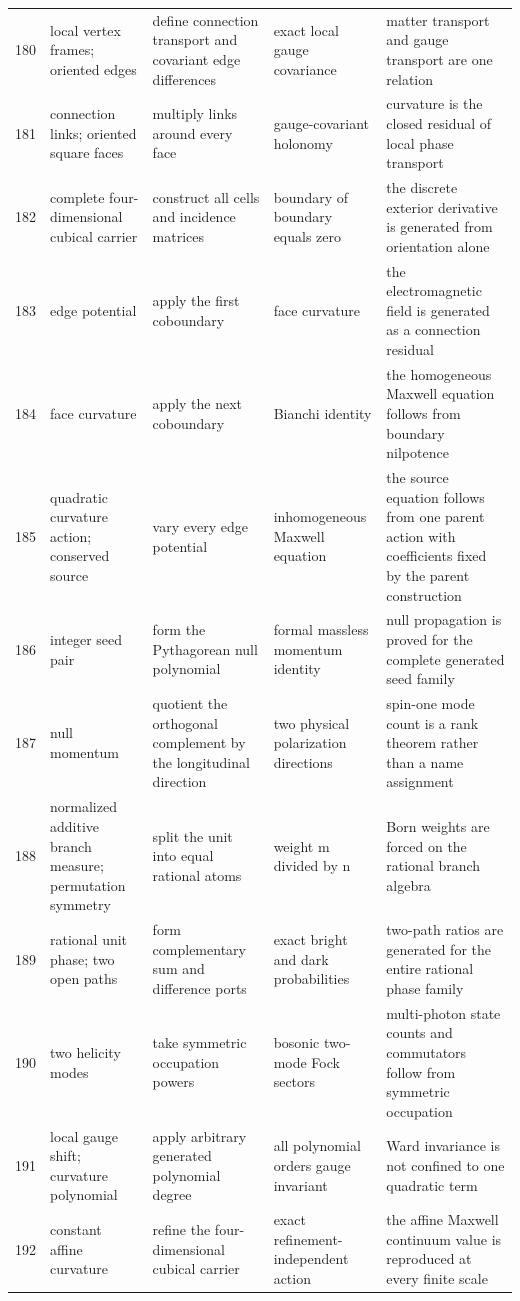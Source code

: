 \documentclass[11pt]{article}
\numberwithin{equation}{section}
\theoremstyle{remark}
\begin{document}
\begin{landscape}
\begin{longtable}{p{0.65cm}p{3.5cm}p{4.0cm}p{4.0cm}p{4.6cm}}
180&local vertex frames; oriented edges&define connection transport and covariant edge differences&exact local gauge covariance&matter transport and gauge transport are one relation\\
181&connection links; oriented square faces&multiply links around every face&gauge-covariant holonomy&curvature is the closed residual of local phase transport\\
182&complete four-dimensional cubical carrier&construct all cells and incidence matrices&boundary of boundary equals zero&the discrete exterior derivative is generated from orientation alone\\
183&edge potential&apply the first coboundary&face curvature&the electromagnetic field is generated as a connection residual\\
184&face curvature&apply the next coboundary&Bianchi identity&the homogeneous Maxwell equation follows from boundary nilpotence\\
185&quadratic curvature action; conserved source&vary every edge potential&inhomogeneous Maxwell equation&the source equation follows from one parent action with coefficients fixed by the parent construction\\
186&integer seed pair&form the Pythagorean null polynomial&formal massless momentum identity&null propagation is proved for the complete generated seed family\\
187&null momentum&quotient the orthogonal complement by the longitudinal direction&two physical polarization directions&spin-one mode count is a rank theorem rather than a name assignment\\
188&normalized additive branch measure; permutation symmetry&split the unit into equal rational atoms&weight m divided by n&Born weights are forced on the rational branch algebra\\
189&rational unit phase; two open paths&form complementary sum and difference ports&exact bright and dark probabilities&two-path ratios are generated for the entire rational phase family\\
190&two helicity modes&take symmetric occupation powers&bosonic two-mode Fock sectors&multi-photon state counts and commutators follow from symmetric occupation\\
191&local gauge shift; curvature polynomial&apply arbitrary generated polynomial degree&all polynomial orders gauge invariant&Ward invariance is not confined to one quadratic term\\
192&constant affine curvature&refine the four-dimensional cubical carrier&exact refinement-independent action&the affine Maxwell continuum value is reproduced at every finite scale\\

\end{longtable}
\end{landscape}
\end{document}

